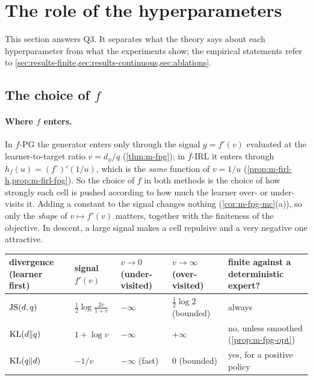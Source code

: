 \section{The role of the hyperparameters}\label{sec:hyper}

This section answers Q3. It separates what the theory says about each hyperparameter from what the experiments show; the empirical statements refer to \cref{sec:results-finite,sec:results-continuous,sec:ablations}.

\subsection{The choice of \texorpdfstring{$f$}{f}}\label{sec:m-choice-f}

\paragraph{Where $f$ enters.}
In $f$-PG the generator enters only through the signal $g=f'(v)$ evaluated at the learner-to-target ratio $v=d_\phi/q$ (\cref{thm:m-fpg}); in $f$-IRL it enters through $h_f(u)=(f^\circ)'(1/u)$, which is the \emph{same} function of $v=1/u$ (\cref{prop:m-firl-h,prop:m-firl-fpg}).
So the choice of $f$ in both methods is the choice of how strongly each cell is pushed according to how much the learner over- or under-visits it.
Adding a constant to the signal changes nothing (\cref{cor:m-fpg-mc}(a)), so only the \emph{shape} of $v\mapsto f'(v)$ matters, together with the finiteness of the objective.
In descent, a large signal makes a cell repulsive and a very negative one attractive.
\begin{center}\small
\begin{tabularx}{\textwidth}{@{}>{\raggedright\arraybackslash}p{2.6cm}>{\raggedright\arraybackslash}p{2.2cm}>{\raggedright\arraybackslash}p{2.3cm}>{\raggedright\arraybackslash}p{2.6cm}>{\raggedright\arraybackslash}X@{}}
\toprule
divergence (learner first) & signal $f'(v)$ & $v\to0$ (under-visited) & $v\to\infty$ (over-visited) & finite against a deterministic expert?\\
\midrule
$\mathrm{JS}(d,q)$ & $\frac12\log\frac{2v}{1+v}$ & $-\infty$ & $\frac12\log2$ (bounded) & always\\
$\mathrm{KL}(d\Vert q)$ & $1+\log v$ & $-\infty$ & $+\infty$ & no, unless smoothed (\cref{prop:m-fpg-opt})\\
$\mathrm{KL}(q\Vert d)$ & $-1/v$ & $-\infty$ (fast) & $0$ (bounded) & yes, for a positive policy\\
\bottomrule
\end{tabularx}
\end{center}
